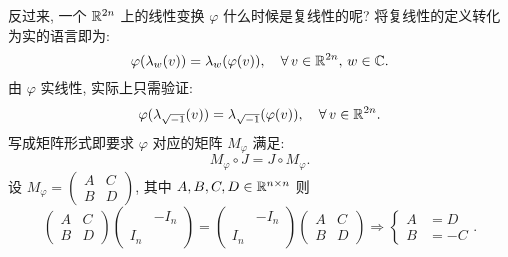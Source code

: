             反过来, 一个 $\mathbb{R}^{2n}$ 上的线性变换 $\varphi$ 什么时候是复线性的呢? 将复线性的定义转化为实的语言即为:
            \begin{equation*}
                \varphi(\lambda_{w}(v)) = \lambda_{w}(\varphi(v)),\quad\forall\,v\in\mathbb{R}^{2n},\,w\in\mathbb{C}.
            \end{equation*}
            由 $\varphi$ 实线性, 实际上只需验证:
            \begin{equation*}
                \varphi(\lambda_{\sqrt{-1}}(v)) = \lambda_{\sqrt{-1}}(\varphi(v)),\quad\forall\,v\in\mathbb{R}^{2n}.
            \end{equation*}
            写成矩阵形式即要求 $\varphi$ 对应的矩阵 $M_{\varphi}$ 满足:
            \begin{equation}\label{C-linear}
                M_{\varphi}\circ J = J\circ M_{\varphi}.
            \end{equation}
            设 $M_{\varphi} = \begin{pmatrix} A & C \\ B & D \end{pmatrix}$, 其中 $A,B,C,D\in\mathbb{R}^{n\times n}$ 则
            \begin{equation*}
                \begin{pmatrix} A & C \\ B & D \end{pmatrix}\begin{pmatrix} & -I_n \\ I_n & \end{pmatrix} = 
                \begin{pmatrix} & -I_n \\ I_n & \end{pmatrix}\begin{pmatrix} A & C \\ B & D \end{pmatrix} \Rightarrow
                \left\{\begin{aligned} A &= D \\ B &= -C \end{aligned}\right. .
            \end{equation*}

